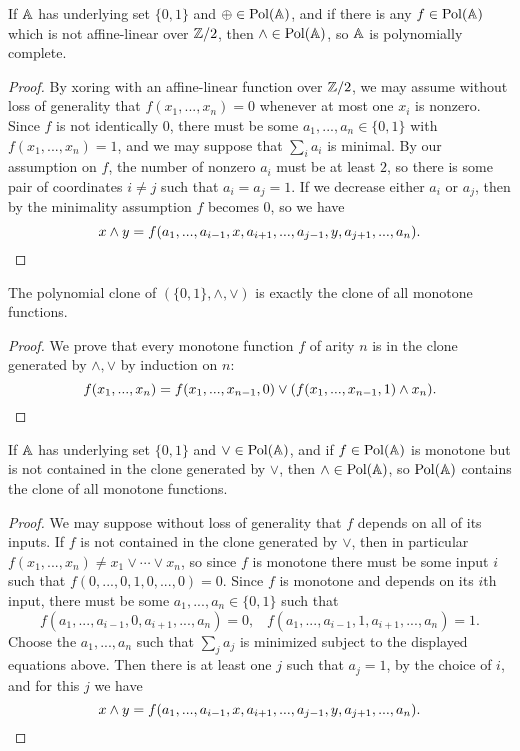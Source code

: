\begin{appendices}
\begin{lem}\label{lem-permutational-xor} If $\mathbb{A}$ has underlying set $\{0,1\}$ and $\oplus \in \operatorname{Pol}(\mathbb{A})$, and if there is any $f \in \operatorname{Pol}(\mathbb{A})$ which is not affine-linear over $\mathbb{Z}/2$, then $\wedge \in \operatorname{Pol}(\mathbb{A})$, so $\mathbb{A}$ is polynomially complete.
\end{lem}
\begin{proof} By xoring with an affine-linear function over $\mathbb{Z}/2$, we may assume without loss of generality that $f(x_1, ..., x_n) = 0$ whenever at most one $x_i$ is nonzero. Since $f$ is not identically $0$, there must be some $a_1, ..., a_n \in \{0,1\}$ with $f(x_1, ..., x_n) = 1$, and we may suppose that $\sum_i a_i$ is minimal. By our assumption on $f$, the number of nonzero $a_i$ must be at least $2$, so there is some pair of coordinates $i\ne j$ such that $a_i = a_j = 1$. If we decrease either $a_i$ or $a_j$, then by the minimality assumption $f$ becomes $0$, so we have
\[
x \wedge y = f(a_1, ..., a_{i-1}, x, a_{i+1}, ..., a_{j-1}, y, a_{j+1}, ..., a_n).\qedhere
\]
\end{proof}

\begin{prop} The polynomial clone of $(\{0,1\}, \wedge, \vee)$ is exactly the clone of all monotone functions.
\end{prop}
\begin{proof} We prove that every monotone function $f$ of arity $n$ is in the clone generated by $\wedge, \vee$ by induction on $n$:
\[
f(x_1, ..., x_n) = f(x_1, ..., x_{n-1}, 0) \vee (f(x_1, ..., x_{n-1}, 1) \wedge x_n).\qedhere
\]
\end{proof}

\begin{lem}\label{lem-permutational-or} If $\mathbb{A}$ has underlying set $\{0,1\}$ and $\vee \in \operatorname{Pol}(\mathbb{A})$, and if $f \in \operatorname{Pol}(\mathbb{A})$ is monotone but is not contained in the clone generated by $\vee$, then $\wedge \in \operatorname{Pol}(\mathbb{A})$, so $\operatorname{Pol}(\mathbb{A})$ contains the clone of all monotone functions.
\end{lem}
\begin{proof} We may suppose without loss of generality that $f$ depends on all of its inputs. If $f$ is not contained in the clone generated by $\vee$, then in particular $f(x_1, ..., x_n) \ne x_1 \vee \cdots \vee x_n$, so since $f$ is monotone there must be some input $i$ such that $f(0, ..., 0, 1, 0, ..., 0) = 0$. Since $f$ is monotone and depends on its $i$th input, there must be some $a_1, ..., a_n \in \{0,1\}$ such that
\[
f(a_1, ..., a_{i-1}, 0, a_{i+1}, ..., a_n) = 0, \;\;\; f(a_1, ..., a_{i-1}, 1, a_{i+1}, ..., a_n) = 1.
\]
Choose the $a_1, ..., a_n$ such that $\sum_j a_j$ is minimized subject to the displayed equations above. Then there is at least one $j$ such that $a_j = 1$, by the choice of $i$, and for this $j$ we have
\[
x \wedge y = f(a_1, ..., a_{i-1}, x, a_{i+1}, ..., a_{j-1}, y, a_{j+1}, ..., a_n).\qedhere
\]
\end{proof}


\end{appendices}
